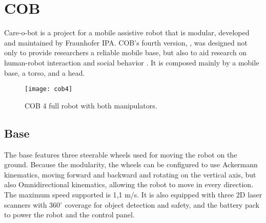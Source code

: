 

\section{COB}

Care-o-bot is a project for a mobile assistive robot that is modular, developed and maintained by Fraunhofer IPA. COB's fourth version, , was designed not only to provide researchers a reliable mobile base, but also to aid research on human-robot interaction and social behavior \cite{mci/Kittmann2015}. It is composed mainly by a mobile base, a torso, and a head.

\begin{figure}[!ht]
\centering
\texttt{[image: cob4]}
\caption{COB 4 full robot with both manipulators.}
\label{fig:cob4}
\end{figure}

\subsection{Base}

The base features three steerable wheels used for moving the robot on the ground. Because the modularity, the wheels can be configured to use Ackermann kinematics, moving forward and backward and rotating on the vertical axis, but also Omnidirectional kinematics, allowing the robot to move in every direction. The maximum speed supported is 1,1 m/s. It is also equipped with three 2D laser scanners with 360$^{\circ}$ coverage for object detection and safety, and the battery pack to power the robot and the control panel.


